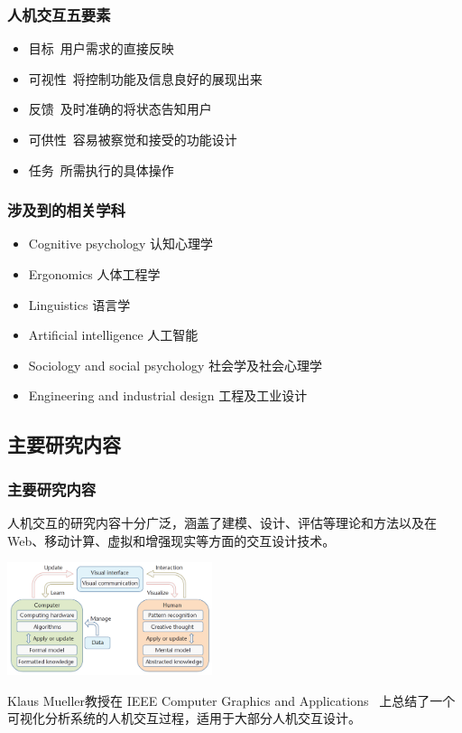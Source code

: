 \documentclass{beamer}
\begin{document}
\begin{frame}
	\frametitle{人机交互五要素}
	\begin{itemize}
		\item 目标~{\small 用户需求的直接反映}
		\item 可视性~{\small 将控制功能及信息良好的展现出来}
		\item 反馈~{\small 及时准确的将状态告知用户}
		\item 可供性~{\small 容易被察觉和接受的功能设计}
		\item 任务~{\small 所需执行的具体操作}
	\end{itemize}
\end{frame}

\begin{frame}
	\frametitle{涉及到的相关学科}
	\begin{itemize}
		\item Cognitive psychology 认知心理学
		\item Ergonomics 人体工程学
		\item Linguistics 语言学
		\item Artificial intelligence 人工智能
		\item Sociology and social psychology 社会学及社会心理学
		\item Engineering and industrial design 工程及工业设计
	\end{itemize}
\end{frame}

\subsection{主要研究内容}
\begin{frame}
	\frametitle{主要研究内容}
	人机交互的研究内容十分广泛，涵盖了建模、设计、评估等理论和方法以及在Web、移动计算、虚拟和增强现实等方面的交互设计技术。
	\begin{center}
		\includegraphics[width=6cm]{images/hci_research.jpg}
	\end{center}
	{\tiny Klaus Mueller教授在 IEEE Computer Graphics and Applications~\cite{DBLP:journals/cga/MuellerGNBM11} 上总结了一个可视化分析系统的人机交互过程，适用于大部分人机交互设计。}
\end{frame}
\end{document}
